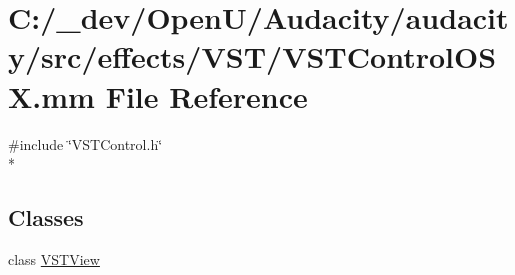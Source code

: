\hypertarget{_v_s_t_control_o_s_x_8mm}{}\section{C\+:/\+\_\+dev/\+Open\+U/\+Audacity/audacity/src/effects/\+V\+S\+T/\+V\+S\+T\+Control\+O\+SX.mm File Reference}
\label{_v_s_t_control_o_s_x_8mm}
{\ttfamily \#include \char`\"{}V\+S\+T\+Control.\+h\char`\"{}}\\*
\subsection*{Classes}
\begin{DoxyCompactItemize}
\item 
class \hyperlink{interface_v_s_t_view}{V\+S\+T\+View}
\end{DoxyCompactItemize}
